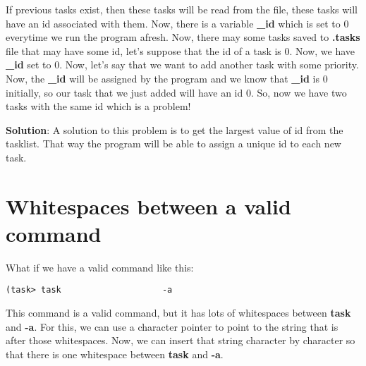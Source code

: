 \documentclass{article}
\makeatletter
\renewcommand\paragraph{\@startsection{paragraph}{4}{\z@}{-3.25ex \@plus -1ex \@minus -.2ex}{1.5ex \@plus .2ex}{\normalfont\normalsize\bfseries}}
\makeatother
\begin{document}
\paragraph{}

If previous tasks exist, then these tasks will be read from the file, these tasks will have an id associated with them. Now, there is a variable \textbf{\_id} which is set to $0$ everytime we run the program afresh. Now, there may some tasks saved to \textbf{.tasks} file that may have some id, let's suppose that the id of a task is $0$. Now, we have \textbf{\_id} set to $0$. Now, let's say that we want to add another task with some priority. Now, the \textbf{\_id} will be assigned by the program and we know that \textbf{\_id} is $0$ initially, so our task that we just added will have an id $0$. So, now we have two tasks with the same id which is a problem!

\textbf{Solution}: A solution to this problem is to get the largest value of id from the tasklist. That way the program will be able to assign a unique id to each new task.

\section{Whitespaces between a valid command}\label{sec:sec10}
\paragraph{}

What if we have a valid command like this:
\begin{Verbatim}[frame=single]
(task> task                    -a
\end{Verbatim}

This command is a valid command, but it has lots of whitespaces between \textbf{task} and \textbf{-a}.
\newpage
For this, we can use a character pointer to point to the string that is after those whitespaces. Now, we can insert that string character by character so that there is one whitespace between \textbf{task} and \textbf{-a}.
\end{document}
